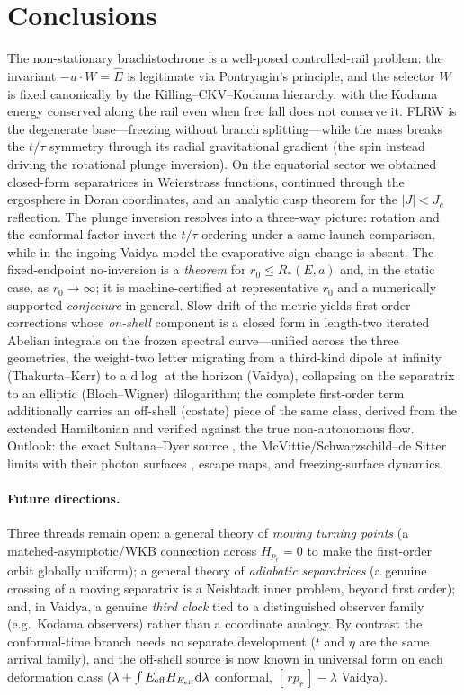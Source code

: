 \documentclass[
    aps, prd, twocolumn, superscriptaddress,
    showpacs, nofootinbib, floatfix
]{revtex4-2}
\newcommand{\Ehat}{\hat E}
\newcommand{\Jc}{J_{c}}
\newcommand{\dd}{\mathrm{d}}
\begin{document}
\section{Conclusions}
\label{sec:concl}
The non-stationary brachistochrone is a well-posed controlled-rail problem: the
invariant $-u\cdot W=\Ehat$ is legitimate via Pontryagin's principle, and the
selector $W$ is fixed canonically by the Killing--CKV--Kodama hierarchy, with
the Kodama energy conserved along the rail even when free fall does not conserve
it. FLRW is the degenerate base---freezing without branch splitting---while the
mass breaks the $t/\tau$ symmetry through its radial gravitational gradient (the
spin instead driving the rotational plunge inversion). On
the equatorial sector we obtained closed-form separatrices in Weierstrass
functions, continued through the ergosphere in Doran coordinates, and an analytic
cusp theorem for the $|J|<\Jc$ reflection. The plunge inversion resolves into a
three-way picture: rotation and the conformal factor invert the $t/\tau$
ordering under a same-launch comparison, while in the ingoing-Vaidya model the
evaporative sign change is absent. The fixed-endpoint no-inversion is a \emph{theorem}
for $r_0\le R_\ast(E,a)$ and, in the static case, as $r_0\to\infty$; it is
machine-certified at representative $r_0$ and a numerically supported \emph{conjecture}
in general. Slow drift of the metric yields first-order corrections whose
\emph{on-shell} component is a closed form in length-two iterated Abelian integrals on
the frozen spectral curve---unified across the three geometries, the weight-two letter
migrating from a third-kind dipole at infinity (Thakurta--Kerr) to a $\dd\log$ at the
horizon (Vaidya), collapsing on the separatrix to an elliptic (Bloch--Wigner)
dilogarithm; the complete first-order term additionally carries an off-shell (costate)
piece of the same class, derived from the extended Hamiltonian and verified against the
true non-autonomous flow. Outlook: the
exact Sultana--Dyer source
\cite{SultanaDyer2005}, the McVittie/Schwarzschild--de Sitter limits
\cite{McVittie1933,Kottler1918,Kaloper2010} with their photon surfaces
\cite{ClaudelViracVirbhadra2001}, escape maps, and freezing-surface dynamics.

\paragraph{Future directions.} Three threads remain open: a general theory of
\emph{moving turning points} (a matched-asymptotic/WKB connection across $H_{p_r}=0$
to make the first-order orbit globally uniform); a general theory of \emph{adiabatic
separatrices} (a genuine crossing of a moving separatrix is a Neishtadt inner problem,
beyond first order); and, in Vaidya, a genuine \emph{third clock} tied to a
distinguished observer family (e.g.\ Kodama observers) rather than a coordinate
analogy. By contrast the conformal-time branch needs no separate development ($t$ and
$\eta$ are the same arrival family), and the off-shell source is now known in universal
form on each deformation class ($\lambda+\int E_{\rm eff}H_{E_{\rm eff}}\dd\lambda$
conformal, $[\,rp_r\,]-\lambda$ Vaidya).
\end{document}
